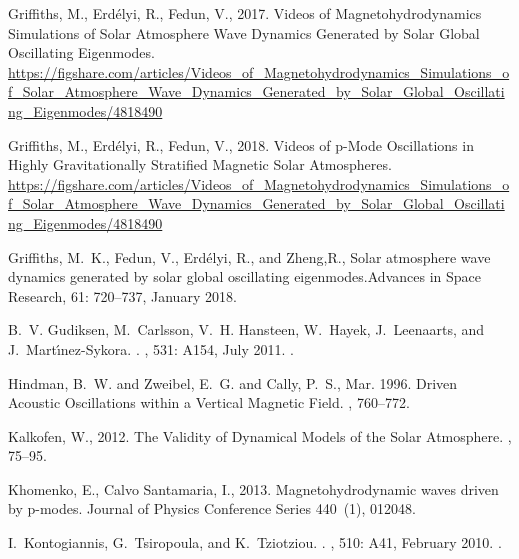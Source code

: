 \documentclass[linenumbers]{aastex63}
\begin{document}
\begin{thebibliography}{}
{Griffiths}, M., {Erd{\'e}lyi}, R., {Fedun}, V., 2017. {Videos of
  Magnetohydrodynamics Simulations of Solar Atmosphere Wave Dynamics Generated
  by Solar Global Oscillating Eigenmodes}.
\newline \url{https://figshare.com/articles/Videos_of_Magnetohydrodynamics_Simulations_of_Solar_Atmosphere_Wave_Dynamics_Generated_by_Solar_Global_Oscillating_Eigenmodes/4818490}

{Griffiths}, M., {Erd{\'e}lyi}, R., {Fedun}, V., 2018. {Videos of p-Mode Oscillations in Highly Gravitationally Stratified Magnetic Solar Atmospheres}.
\newline \url{https://figshare.com/articles/Videos_of_Magnetohydrodynamics_Simulations_of_Solar_Atmosphere_Wave_Dynamics_Generated_by_Solar_Global_Oscillating_Eigenmodes/4818490}




{Griffiths}, M.~K., {Fedun}, V., {Erd{\'e}lyi}, R., and {Zheng},R.,
{Solar atmosphere wave dynamics generated by solar global oscillating
  eigenmodes}.{Advances in Space Research}, 61: 720--737, January 2018.

B.~V. {Gudiksen}, M.~{Carlsson}, V.~H. {Hansteen}, W.~{Hayek}, J.~{Leenaarts},
  and J.~{Mart{\'{\i}}nez-Sykora}.
.
\newblock \emph{\aap}, 531: A154, July 2011.
\newblock {}.


{Hindman}, B.~W. and {Zweibel}, E.~G. and {Cally}, P.~S., Mar. 1996. {Driven Acoustic Oscillations within a Vertical Magnetic Field}. , 760--772.

{Kalkofen}, W., 2012. {The Validity of Dynamical Models of the Solar
  Atmosphere}. , 75--95.

{Khomenko}, E., {Calvo Santamaria}, I., 2013. {Magnetohydrodynamic waves driven
  by p-modes}. Journal of Physics Conference Series 440~(1), 012048.


I.~{Kontogiannis}, G.~{Tsiropoula}, and K.~{Tziotziou}.
.
\newblock \emph{\aap}, 510: A41, February 2010.
\newblock {}.


\end{thebibliography}
\end{document}
